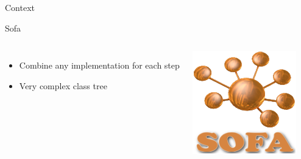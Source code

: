 \documentclass[xcolor={usenames,dvipsnames}]{beamer}
\begin{document}
\begin{frame}{Context}
\begin{alertblock}{Sofa \cite{Allard07SOFA,Nesme09Preserving,Faure11Sparse}}
\begin{columns}
\begin{itemize}[<+->]
                \item Combine any implementation for each step
                \item Very complex class tree
            \end{itemize}
            \includegraphics[width=.9\textwidth]{sofa.png}
        \end{columns}
    \end{alertblock}
\end{frame}
\end{document}
